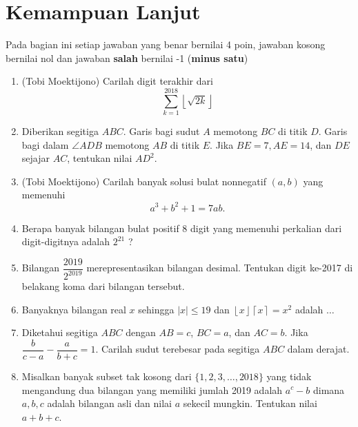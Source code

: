 \documentclass[11pt]{scrartcl}
\begin{document}
\section{Kemampuan Lanjut}
Pada bagian ini setiap jawaban yang benar bernilai 4 poin, jawaban kosong bernilai nol
dan jawaban \textbf{salah} bernilai -1 (\textbf{minus satu})

\begin{enumerate}[resume]
	\item (Tobi Moektijono)
	Carilah digit terakhir dari $$\sum_{k=1}^{2018} \left \lfloor \sqrt{2k} \right \rfloor $$
	
	\item Diberikan segitiga $ABC$. Garis bagi sudut $A$ memotong $BC$ di titik $D$. Garis bagi
	dalam $\angle ADB$ memotong $AB$ di titik $E$. Jika $BE = 7, AE = 14$, dan $DE$ sejajar $AC$,
	tentukan nilai $AD^2$.
	
	\item (Tobi Moektijono)
	Carilah banyak solusi bulat nonnegatif $(a,b)$ yang memenuhi $$a^3+b^2+1=7ab.$$
	
	\item
	Berapa banyak bilangan bulat positif 8 digit yang memenuhi perkalian dari digit-digitnya adalah $2^{21}$
	?
	
	\item Bilangan $\dfrac{2019}{2^{2019}}$ merepresentasikan bilangan desimal. Tentukan digit ke-2017 di belakang koma dari bilangan tersebut.
	
	\item Banyaknya bilangan real $x$ sehingga $|x| \le 19$ dan $\left \lfloor x \right \rfloor\left \lceil x \right \rceil = x^2$ adalah $\dots$
	
	\item Diketahui segitiga $ABC$ dengan $AB=c$, $BC=a$, dan $AC=b$. Jika $\dfrac{b}{c-a} - \dfrac{a}{b+c} = 1$. Carilah sudut terebesar pada segitiga $ABC$ dalam derajat.
	
	\item
	Misalkan banyak subset tak kosong dari $\{1,2,3,\dots,2018\}$ yang tidak mengandung dua bilangan yang memiliki jumlah 2019 adalah $a^c-b$ dimana $a,b,c$ adalah bilangan asli dan nilai $a$ sekecil mungkin. Tentukan nilai $a+b+c$.

\end{enumerate}
	
	
	
\end{document}
